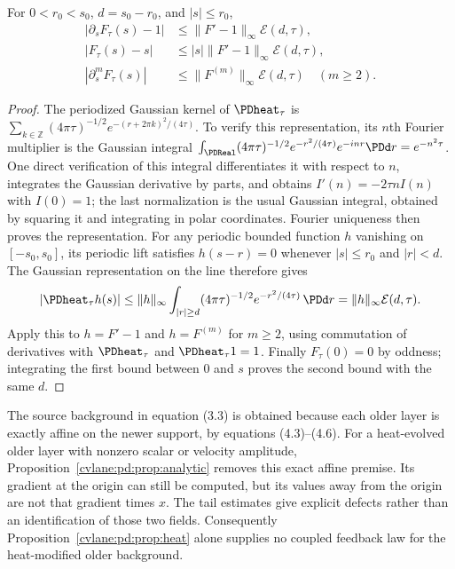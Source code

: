 \begin{cvlanepdproposition}\label{cvlane:pd:prop:tail}
For $0<r_0<s_0$, $d=s_0-r_0$, and $|s|\leq r_0$,
\begin{align}
 |\partial_sF_\tau(s)-1|&\leq\|F'-1\|_\infty\mathcal E(d,\tau),\label{cvlane:pd:eq:tail1}\\
 |F_\tau(s)-s|&\leq |s|\|F'-1\|_\infty\mathcal E(d,\tau),\label{cvlane:pd:eq:tail0}\\
 |\partial_s^mF_\tau(s)|&\leq\|F^{(m)}\|_\infty\mathcal E(d,\tau)
   \quad(m\geq2).\label{cvlane:pd:eq:tailm}
\end{align}
\end{cvlanepdproposition}
\begin{proof}
The periodized Gaussian kernel of $\PDheat_\tau$ is
$\sum_{k\in\mathbb Z}(4\pi\tau)^{-1/2}
e^{-(r+2\pi k)^2/(4\tau)}$. To verify this representation, its $n$th
Fourier multiplier is the Gaussian integral
$\int_{\PDReal}(4\pi\tau)^{-1/2}e^{-r^2/(4\tau)}e^{-inr}\PDd r=e^{-n^2\tau}$.
One direct verification of this integral differentiates it with respect
to $n$, integrates the Gaussian derivative by parts, and obtains
$I'(n)=-2\tau n I(n)$ with $I(0)=1$; the last normalization is the usual
Gaussian integral, obtained by squaring it and integrating in polar
coordinates. Fourier uniqueness then proves the representation.
For any periodic bounded function $h$ vanishing on $[-s_0,s_0]$, its
periodic lift satisfies $h(s-r)=0$ whenever $|s|\leq r_0$ and $|r|<d$.
The Gaussian representation on the line therefore gives
\[
 |\PDheat_\tau h(s)|\leq
 \|h\|_\infty\int_{|r|\geq d}
 (4\pi\tau)^{-1/2}e^{-r^2/(4\tau)}\,\PDd r
 =\|h\|_\infty\mathcal E(d,\tau).
\]
Apply this to $h=F'-1$ and $h=F^{(m)}$ for $m\geq2$, using commutation
of derivatives with $\PDheat_\tau$ and $\PDheat_\tau1=1$.
Finally $F_\tau(0)=0$ by oddness; integrating the first bound between
$0$ and $s$ proves the second bound with the same $d$.
\end{proof}

The source background in equation (3.3) is obtained because each older
layer is exactly affine on the newer support, by equations (4.3)--(4.6).
For a heat-evolved older layer with nonzero scalar or velocity amplitude,
Proposition~\ref{cvlane:pd:prop:analytic} removes this exact affine premise.
Its gradient at the origin can still be computed, but its values away
from the origin are not that gradient times $x$. The tail estimates give
explicit defects rather than an identification of those two fields.
Consequently Proposition~\ref{cvlane:pd:prop:heat} alone supplies no coupled feedback
law for the heat-modified older background.

